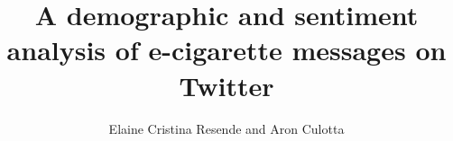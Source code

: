 \documentclass{sig-alternate}
\begin{document}
%

\title{A demographic and sentiment analysis of e-cigarette messages on Twitter}
%
%
%
%
%

%
\author{
%
%
\alignauthor
Elaine Cristina Resende and Aron Culotta\\
       \\
       \\
       \\
}
\end{document}
